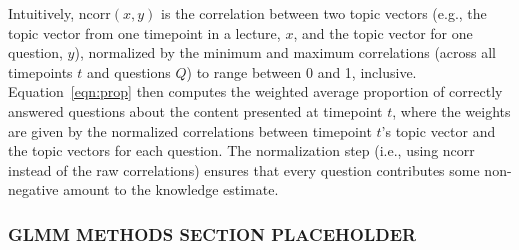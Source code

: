 \documentclass[10pt]{article}
\begin{document}
Intuitively, $\mathrm{ncorr}(x, y)$ is the correlation between two topic
vectors (e.g., the topic vector from one timepoint in a lecture, $x$, and the
topic vector for one question, $y$), normalized by the minimum and maximum
correlations (across all timepoints $t$ and questions $Q$) to range between 0
and 1, inclusive. Equation~\ref{eqn:prop} then computes the weighted average
proportion of correctly answered questions about the content presented at
timepoint $t$, where the weights are given by the normalized correlations
between timepoint $t$'s topic vector and the topic vectors for each question.
The normalization step (i.e., using $\mathrm{ncorr}$ instead of the raw
correlations) ensures that every question contributes some non-negative amount
to the knowledge estimate.

\subsubsection*{GLMM METHODS SECTION PLACEHOLDER}\label{subsec:glmm}
\end{document}
